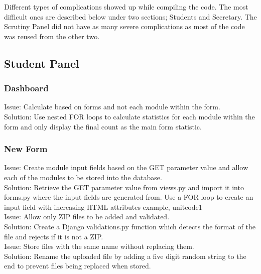 \documentclass[../main.tex]{subfiles}
\begin{document}
\raggedright
Different types of complications showed up while compiling the code. The most difficult ones are described below under two sections; Students and Secretary. The Scrutiny Panel did not have as many severe complications as most of the code was reused from the other two. 

\subsection{Student Panel}

\subsubsection{Dashboard}
Issue: Calculate based on forms and not each module within the form. \\
Solution: Use nested FOR loops to calculate statistics for each module within the form and only display the final count as the main form statistic.                                                                  \\[2mm]


\subsubsection{New Form}
Issue: Create module input fields based on the GET parameter value and allow each of the modules to be stored into the database. \\
Solution: Retrieve the GET parameter value from views.py and import it into forms.py where the input fields are generated from. Use a FOR loop to create an input field with increasing HTML attributes example, unitcode1 \\[2mm]

Issue: Allow only ZIP files to be added and validated.                                                                 \\
Solution: Create a Django validations.py function which detects the format of the file and rejects if it is not a ZIP.                                                                                               \\[2mm]

Issue: Store files with the same name without replacing them.                                                                   \\
Solution: Rename the uploaded file by adding a five digit random string to the end to prevent files being replaced when stored.                                                                                          \\[2mm]
\end{document}
